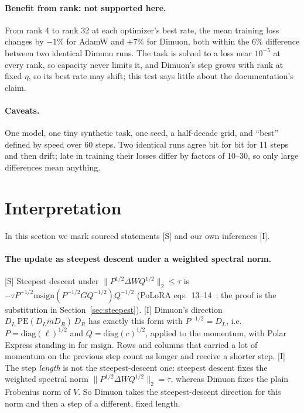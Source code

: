 \documentclass[11pt]{article}
\newcommand{\PE}{\mathrm{PE}}
\newcommand{\msign}{\mathrm{msign}}
\newcommand{\diag}{\mathrm{diag}}
\begin{document}
\paragraph{Benefit from rank: not supported here.} From rank 4 to rank 32 at each optimizer's
best rate, the mean training loss changes by $-1\%$ for AdamW and $+7\%$ for Dimuon, both within
the 6\% difference between two identical Dimuon runs. The task is solved to a loss near $10^{-5}$
at every rank, so capacity never limits it, and Dimuon's step grows with rank at fixed $\eta$, so
its best rate may shift; this test says little about the documentation's claim.

\paragraph{Caveats.} One model, one tiny synthetic task, one seed, a half-decade grid, and ``best''
defined by speed over 60 steps. Two identical runs agree bit for bit for 11 steps and then drift;
late in training their losses differ by factors of 10--30, so only large differences mean
anything.

\section{Interpretation}\label{sec:interp}

In this section we mark sourced statements [S] and our own inferences [I].

\paragraph{The update as steepest descent under a weighted spectral norm.} [S] Steepest descent under
$\|P^{1/2}\Delta WQ^{1/2}\|_2\le\tau$ is $-\tau P^{-1/2}\msign(P^{-1/2}GQ^{-1/2})Q^{-1/2}$ (PoLoRA
eqs.~13--14~\cite{polora}; the proof is the substitution in Section~\ref{sec:steepest}). [I] Dimuon's
direction $D_L\,\PE(D_L\tilde mD_R)\,D_R$ has exactly this form with $P^{-1/2}=D_L$, i.e.\
$P=\diag(\ell)^{1/2}$ and $Q=\diag(c)^{1/2}$, applied to the momentum, with Polar Express standing in
for $\msign$. Rows and columns that carried a lot of momentum on the previous step count as longer and
receive a shorter step. [I] The step \emph{length} is not the steepest-descent one: steepest descent
fixes the weighted spectral norm $\|P^{1/2}\Delta WQ^{1/2}\|_2=\tau$, whereas Dimuon fixes the plain
Frobenius norm of $V$. So Dimuon takes the steepest-descent direction for this norm and then a step of
a different, fixed length.
\end{document}
